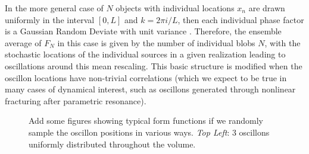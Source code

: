 \documentclass{revtex4}
\begin{document}
In the more general case of $N$ objects with individual locations $x_n$ are drawn uniformly in the interval $[0,L]$ and $k = 2\pi i / L$, then each individual phase factor is a Gaussian Random Deviate with unit variance .
Therefore, the ensemble average of $F_N$ in this case is given by the number of individual blobs $N$, with the stochastic locations of the individual sources in a given realization leading to oscillations around this mean rescaling.
This basic structure is modified when the oscillon locations have non-trivial correlations (which we expect to be true in many cases of dynamical interest, such as oscillons generated through nonlinear fracturing after parametric resonance).
\begin{figure}
  \caption{Add some figures showing typical form functions if we randomly sample the oscillon positions in various ways. \emph{Top Left}: $3$ oscillons uniformly distributed throughout the volume.}
\end{figure}

\end{document}

